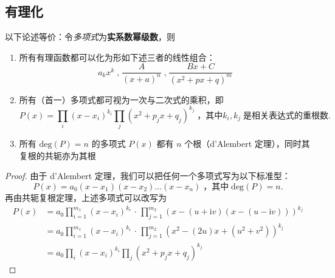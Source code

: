 \documentclass[lang=cn,11pt]{elegantpaper}
\newcommand{\tit}[1]{\textit{#1}}
\newcommand{\tbf}[1]{\textbf{#1}}
\begin{document}
\subsection{有理化}
\begin{theorem}
	以下论述等价：令\tit{多项式}为\tbf{实系数幂级数}，则
	\begin{enumerate}
		\item 所有有理函数都可以化为形如下述三者的线性组合：
		\[
			a_kx^k \; \text{,} \; \frac{A}{(x+a)^n} \; \text{,} \; \frac{Bx+C}{(x^2+px+q)^m}
		\]
		
		\item 所有（首一）多项式都可视为一次与二次式的乘积，即
		\[
			P(x) = \prod_i(x-x_i)^{k_i}\prod_j(x^2+p_jx+q_j)^{k_j} \; \text{，其中} k_i, k_j \; \text{是相关表达式的重根数}.
		\]
		
		\item 所有 $ \mathrm{deg}(P) = n $ 的多项式 $ P(x) $ 都有 $ n $ 个根（d'Alembert 定理），同时其复根的共轭亦为其根
	\end{enumerate}
\end{theorem}
\begin{proof}
由于 d'Alembert 定理，我们可以把任何一个多项式写为以下标准型：
\[
P(x) = a_0(x-x_1)(x-x_2)\dots(x-x_n) \; \text{，其中} \; \mathrm{deg}(P) = n.
\]
再由共轭复根定理，上述多项式可以改写为
\begin{align*}
	P(x) &= a_0\prod_{i=1}^{m_1}(x-x_i)^{k_i} \, \cdot \, \prod_{j=1}^{m_2}(x-(u+\mathrm{i}v)(x-(u-\mathrm{i}v)))^{k_j}\\
	&= a_0\prod_{i=1}^{m_1}(x-x_i)^{k_i} \, \cdot \, \prod_{j=1}^{m_2}(x^2-(2u)x+(u^2+v^2))^{k_j}\\
	&= a_0\prod_i(x-x_i)^{k_i}\prod_j(x^2+p_jx+q_j)^{k_j}
\end{align*}
\end{proof}

%
%
\end{document}
